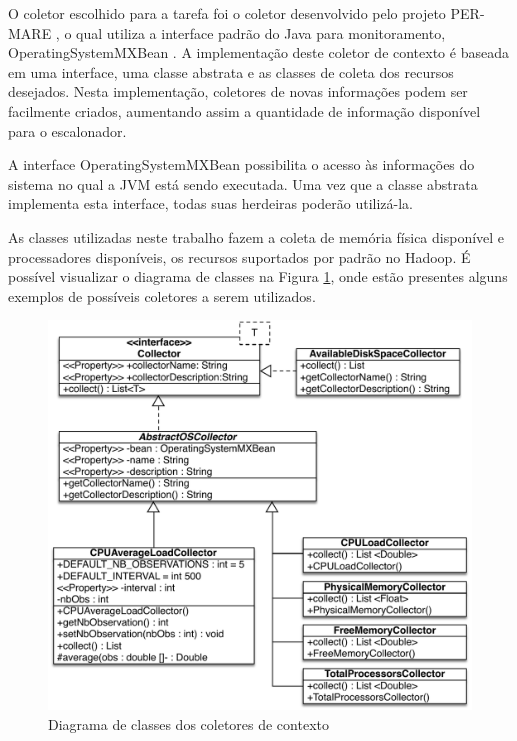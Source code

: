 O coletor escolhido para a tarefa foi o coletor desenvolvido pelo projeto PER-MARE \citet{Collector}, o qual utiliza a interface padrão do Java para monitoramento, OperatingSystemMXBean \cite{MXBean}. A implementação deste coletor de contexto é baseada em uma interface, uma classe abstrata e as classes de coleta dos recursos desejados. Nesta implementação, coletores de novas informações podem ser facilmente criados, aumentando assim a quantidade de informação disponível para o escalonador.

A interface OperatingSystemMXBean possibilita o acesso às informações do sistema no qual a JVM está sendo executada. Uma vez que a classe abstrata implementa esta interface, todas suas herdeiras poderão utilizá-la.

As classes utilizadas neste trabalho fazem a coleta de memória física disponível e processadores disponíveis, os recursos suportados por padrão no Hadoop. É possível visualizar o diagrama de classes na Figura \ref{fig:collectorUML}, onde estão presentes alguns exemplos de possíveis coletores a serem utilizados.

\begin{figure}[!hbt]
   \centering
   \includegraphics[width=15cm]{figuras/CollectorUML2.pdf}
   \caption{Diagrama de classes dos coletores de contexto}
   \label{fig:collectorUML}
\end{figure}

